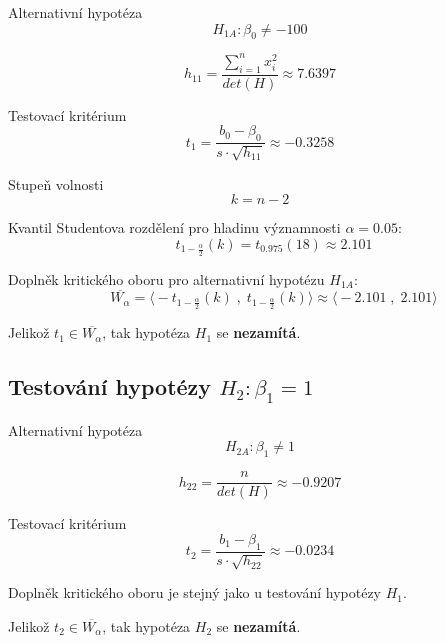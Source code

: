 \begin{compactitem}
    \item Alternativní hypotéza $${\displaystyle H_{1A} : \beta_0 \neq -100}$$

    $${\displaystyle h_{11} = \frac{\sum\limits_{i=1}^n x_i^2} {det(H)} \approx 7.6397}$$

    \item Testovací kritérium
    $${\displaystyle t_1 = \frac{b_0 - \beta_0}{s \cdot \sqrt{h_{11}}} \approx -0.3258}$$

    \item Stupeň volnosti
    $${\displaystyle k = n - 2}$$

    \item Kvantil Studentova rozdělení pro hladinu významnosti ${\displaystyle \alpha = 0.05}$:
    $${\displaystyle \qquad t_{1 - \frac{\alpha}{2}}(k) = t_{0.975}(18) \approx 2.101}$$

    \item Doplněk kritického oboru pro alternativní hypotézu ${\displaystyle H_{1A}}$:
    $${\displaystyle \qquad \overline{W_\alpha} = \big\langle -t_{1 - \frac{\alpha}{2}}(k) \;,\; t_{1 - \frac{\alpha}{2}}(k) \big\rangle \approx \big\langle -2.101 \;,\; 2.101 \big\rangle}$$

    \item Jelikož ${\displaystyle t_1 \in \overline{W_\alpha}}$, tak hypotéza ${\displaystyle H_1}$ se \textbf{nezamítá}.
\end{compactitem}

\subsection{Testování hypotézy ${\displaystyle H_2 : \beta_1 = 1}$}

\begin{compactitem}
    \item Alternativní hypotéza
    $${\displaystyle H_{2A} : \beta_1 \neq 1}$$

    $${\displaystyle h_{22} = \frac{n} {det(H)} \approx -0.9207}$$

    \item Testovací kritérium
    $${\displaystyle t_2 = \frac{b_1 - \beta_1}{s \cdot \sqrt{h_{22}}} \approx -0.0234}$$

    \item Doplněk kritického oboru je stejný jako u testování hypotézy ${\displaystyle H_1}$.

    \item Jelikož ${\displaystyle t_2 \in \overline{W_\alpha}}$, tak hypotéza ${\displaystyle H_2}$ se \textbf{nezamítá}.

\end{compactitem}

